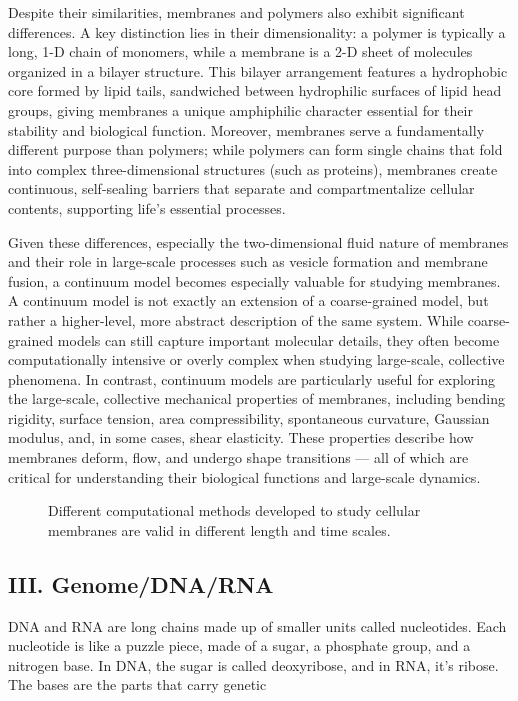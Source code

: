 \documentclass[12pt]{article}
\begin{document}
\begin{flushleft}
Despite their similarities, membranes and polymers also exhibit significant differences. A key distinction lies in their dimensionality: a polymer is typically a long, 1-D chain of monomers, while a membrane is a 2-D sheet of molecules organized in a bilayer structure. This bilayer arrangement features a hydrophobic core formed by lipid tails, sandwiched between hydrophilic surfaces of lipid head groups, giving membranes a unique amphiphilic character essential for their stability and biological function. Moreover, membranes serve a fundamentally different purpose than polymers; while polymers can form single chains that fold into complex three-dimensional structures (such as proteins), membranes create continuous, self-sealing barriers that separate and compartmentalize cellular contents, supporting life’s essential processes.


Given these differences, especially the two-dimensional fluid nature of membranes and their role in large-scale processes such as vesicle formation and membrane fusion, a continuum model becomes especially valuable for studying membranes. A continuum model is not exactly an extension of a coarse-grained model, but rather a higher-level, more abstract description of the same system. While coarse-grained models can still capture important molecular details, they often become computationally intensive or overly complex when studying large-scale, collective phenomena. In contrast, continuum models are particularly useful for exploring the large-scale, collective mechanical properties of membranes, including bending rigidity, surface tension, area compressibility, spontaneous curvature, Gaussian modulus, and, in some cases, shear elasticity. These properties describe how membranes deform, flow, and undergo shape transitions — all of which are critical for understanding their biological functions and large-scale dynamics.

\begin{figure}[!ht]
  \centering
  \caption{Different computational methods developed to study cellular membranes are valid in different length and time scales.\cite{chabanon2017systems}}
\end{figure}



\vspace{-1em} 
\subsection*{III. Genome/DNA/RNA}
DNA and RNA are long chains made up of smaller units called nucleotides. Each nucleotide is like a puzzle piece, made of a sugar, a phosphate group, and a nitrogen base. In DNA, the sugar is called deoxyribose, and in RNA, it’s ribose. The bases are the parts that carry genetic 


\end{flushleft}
\end{document}
